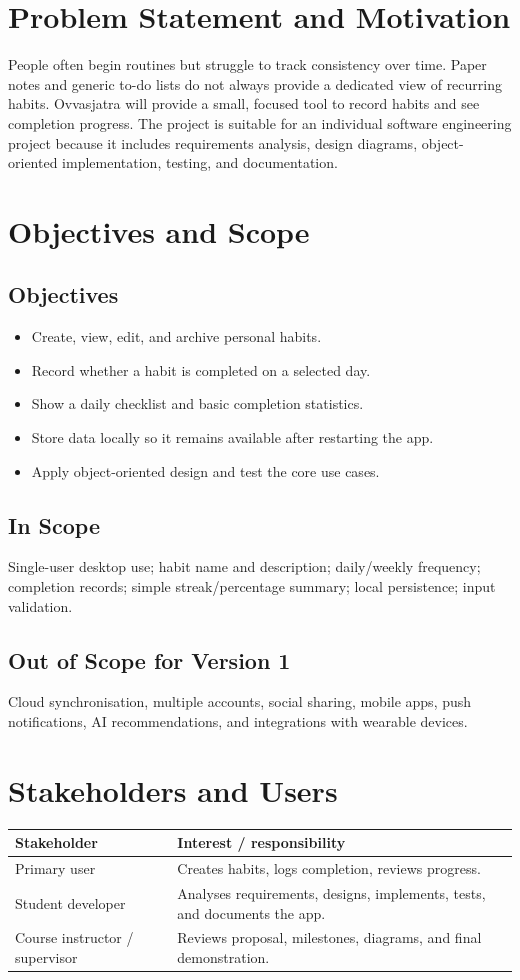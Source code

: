 \documentclass[11pt,a4paper]{article}
\begin{document}
\section{Problem Statement and Motivation}
People often begin routines but struggle to track consistency over time. Paper notes and generic to-do lists do not always provide a dedicated view of recurring habits. Ovvasjatra will provide a small, focused tool to record habits and see completion progress. The project is suitable for an individual software engineering project because it includes requirements analysis, design diagrams, object-oriented implementation, testing, and documentation.

\section{Objectives and Scope}
\subsection{Objectives}
\begin{itemize}
\item Create, view, edit, and archive personal habits.
\item Record whether a habit is completed on a selected day.
\item Show a daily checklist and basic completion statistics.
\item Store data locally so it remains available after restarting the app.
\item Apply object-oriented design and test the core use cases.
\end{itemize}
\subsection{In Scope}
Single-user desktop use; habit name and description; daily/weekly frequency; completion records; simple streak/percentage summary; local persistence; input validation.
\subsection{Out of Scope for Version 1}
Cloud synchronisation, multiple accounts, social sharing, mobile apps, push notifications, AI recommendations, and integrations with wearable devices.

\section{Stakeholders and Users}
\begin{tabularx}{\linewidth}{lX}
\toprule
Stakeholder & Interest / responsibility\\ \midrule
Primary user & Creates habits, logs completion, reviews progress.\\
Student developer & Analyses requirements, designs, implements, tests, and documents the app.\\
Course instructor / supervisor & Reviews proposal, milestones, diagrams, and final demonstration.\\
\bottomrule
\end{tabularx}
\end{document}
